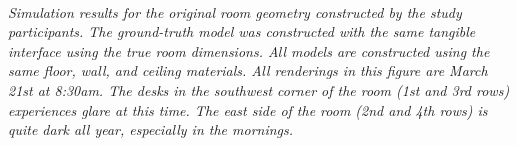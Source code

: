 \documentclass[landscape,20pt]{sciposter}
\begin{document}
\begin{minipage}[t]{17in}
\ \vspace{0.0in} 
\\ 
{\em Simulation results for the original room geometry
  constructed by the study participants.  The ground-truth model was
  constructed with the same tangible interface using the true room
  dimensions.  All models are constructed using the same floor, wall,
  and ceiling materials.  All renderings in this figure are March 21st
  at 8:30am.  The desks in the southwest corner of the room (1st and
  3rd rows) experiences glare at this time.  The east side of the room
  (2nd and 4th rows) is quite dark all year, especially in the
  mornings.  }\\\\

\end{minipage}
\end{document}
